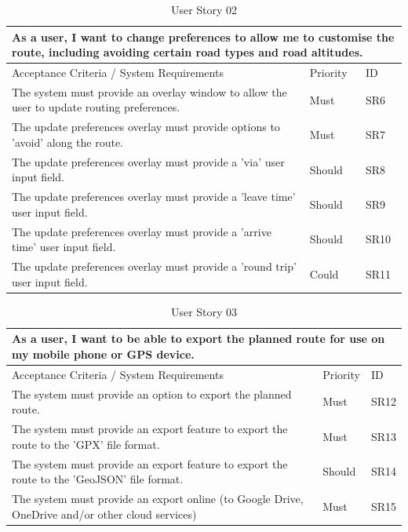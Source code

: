 \begin{table}[!htb]
\caption{User Story 02}
\label{tab:user-story-02}
\begin{tabular}{ p{8cm} p{1cm}  p{1cm} }
\hline
\multicolumn{3}{p{13cm}}{As a user, I want to change preferences to allow me to customise the route, including avoiding certain road types and road altitudes.}\\ 
\hline
Acceptance Criteria / System Requirements & Priority & ID\\
\hline
The system must provide an overlay window to allow the user to update routing preferences. & Must & SR6 \\
The update preferences overlay must provide options to 'avoid' along the route. & Must & SR7\\
The update preferences overlay must provide a 'via' user input field. & Should & SR8\\ 
The update preferences overlay must provide a 'leave time' user input field. & Should & SR9\\ 
The update preferences overlay must provide a 'arrive time' user input field. & Should & SR10\\ 
The update preferences overlay must provide a 'round trip' user input field. & Could & SR11\\ 
\hline
\end{tabular}
\end{table}

\begin{table}[!htb]
\caption{User Story 03}
\label{tab:user-story-03}
\begin{tabular}{ p{8cm} p{1cm}  p{1cm} }
\hline
\multicolumn{3}{p{13cm}}{As a user, I want to be able to export the planned route for use on my mobile phone or GPS device.}\\ 
\hline
Acceptance Criteria / System Requirements & Priority & ID\\
\hline
The system must provide an option to export the planned route. & Must & SR12 \\
The system must provide an export feature to export the route to the 'GPX' file format. & Must & SR13\\
The system must provide an export feature to export the route to the 'GeoJSON' file format. & Should & SR14\\ 
The system must provide an export online (to Google Drive, OneDrive and/or other cloud services) & Must & SR15\\
\hline
\end{tabular}
\end{table}

